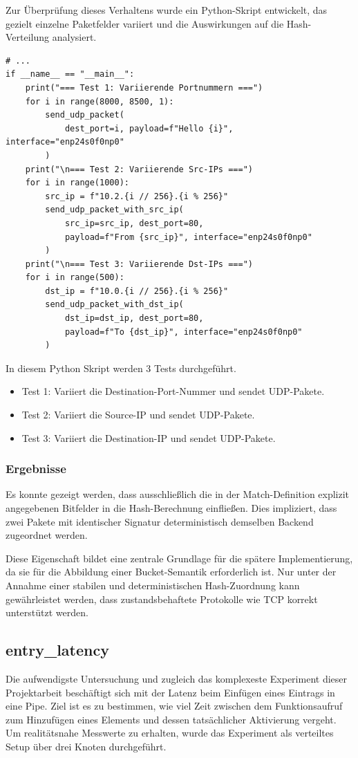 \documentclass[paper=a4, fontsize=11pt]{scrartcl} %
\numberwithin{equation}{section} %
\numberwithin{figure}{section} %
\numberwithin{table}{section} %
\begin{document}
Zur Überprüfung dieses Verhaltens wurde ein Python-Skript entwickelt, das gezielt einzelne Paketfelder variiert und die Auswirkungen auf die Hash-Verteilung analysiert.
\begin{verbatim}
# ...
if __name__ == "__main__":
    print("=== Test 1: Variierende Portnummern ===")
    for i in range(8000, 8500, 1):
        send_udp_packet(
            dest_port=i, payload=f"Hello {i}", interface="enp24s0f0np0"
        )
    print("\n=== Test 2: Variierende Src-IPs ===")
    for i in range(1000):
        src_ip = f"10.2.{i // 256}.{i % 256}"
        send_udp_packet_with_src_ip(
            src_ip=src_ip, dest_port=80, 
            payload=f"From {src_ip}", interface="enp24s0f0np0"
        )
    print("\n=== Test 3: Variierende Dst-IPs ===")
    for i in range(500):
        dst_ip = f"10.0.{i // 256}.{i % 256}"
        send_udp_packet_with_dst_ip(
            dst_ip=dst_ip, dest_port=80, 
            payload=f"To {dst_ip}", interface="enp24s0f0np0"
        )
\end{verbatim}
In diesem Python Skript werden 3 Tests durchgeführt.
\begin{itemize}
    \item Test 1: Variiert die Destination-Port-Nummer und sendet UDP-Pakete.
    \item Test 2: Variiert die Source-IP und sendet UDP-Pakete.
    \item Test 3: Variiert die Destination-IP und sendet UDP-Pakete.
\end{itemize}
\subsubsection*{Ergebnisse}
Es konnte gezeigt werden, dass ausschließlich die in der Match-Definition explizit angegebenen Bitfelder in die Hash-Berechnung einfließen. Dies impliziert, dass zwei Pakete mit identischer Signatur deterministisch demselben Backend zugeordnet werden.

Diese Eigenschaft bildet eine zentrale Grundlage für die spätere Implementierung, da sie für die Abbildung einer Bucket-Semantik erforderlich ist. Nur unter der Annahme einer stabilen und deterministischen Hash-Zuordnung kann gewährleistet werden, dass zustandsbehaftete Protokolle wie TCP korrekt unterstützt werden.
\subsection{entry\_latency}
Die aufwendigste Untersuchung und zugleich das komplexeste Experiment dieser Projektarbeit beschäftigt sich mit der Latenz beim Einfügen eines Eintrags in eine Pipe. Ziel ist es zu bestimmen, wie viel Zeit zwischen dem Funktionsaufruf zum Hinzufügen eines Elements und dessen tatsächlicher Aktivierung vergeht. Um realitätsnahe Messwerte zu erhalten, wurde das Experiment als verteiltes Setup über drei Knoten durchgeführt.
\end{document}
